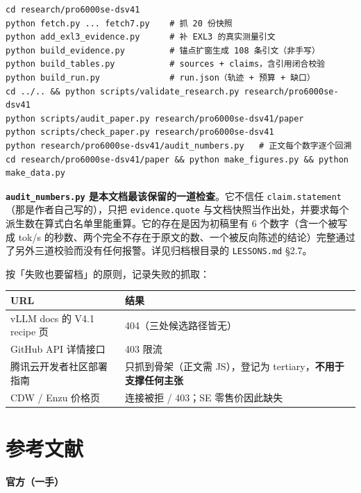 \begin{lstlisting}
cd research/pro6000se-dsv41
python fetch.py ... fetch7.py    # 抓 20 份快照
python add_exl3_evidence.py      # 补 EXL3 的真实测量引文
python build_evidence.py         # 锚点扩窗生成 108 条引文（非手写）
python build_tables.py           # sources + claims，含引用闭合校验
python build_run.py              # run.json（轨迹 + 预算 + 缺口）
cd ../.. && python scripts/validate_research.py research/pro6000se-dsv41
python scripts/audit_paper.py research/pro6000se-dsv41/paper
python scripts/check_paper.py research/pro6000se-dsv41
python research/pro6000se-dsv41/audit_numbers.py   # 正文每个数字逐个回溯
cd research/pro6000se-dsv41/paper && python make_figures.py && python make_data.py
\end{lstlisting}

\textbf{\texttt{audit\_numbers.py} 是本文档最该保留的一道检查}。它不信任 \texttt{claim.statement}（那是作者自己写的），只把 \texttt{evidence.quote} 与文档快照当作出处，并要求每个派生数在算式白名单里能重算。它的存在是因为初稿里有 6 个数字（含一个被写成 tok/s 的秒数、两个完全不存在于原文的数、一个被反向陈述的结论）完整通过了另外三道校验而没有任何报警。详见归档根目录的 \texttt{LESSONS.md} §2.7。


按「失败也要留档」的原则，记录失败的抓取：


\begin{table}[t]
\centering
\footnotesize
\setlength{\tabcolsep}{4pt}
\label{tab:20}
\begin{tabularx}{\textwidth}{XX}
\toprule
URL & 结果 \\
\midrule
vLLM docs 的 V4.1 recipe 页 & 404（三处候选路径皆无） \\
GitHub API 详情接口 & 403 限流 \\
腾讯云开发者社区部署指南 & 只抓到骨架（正文需 JS），登记为 tertiary，\textbf{不用于支撑任何主张} \\
CDW / Enzu 价格页 & 连接被拒 / 403；SE 零售价因此缺失 \\
\bottomrule
\end{tabularx}
\end{table}


\section{参考文献}

\textbf{官方（一手）}


